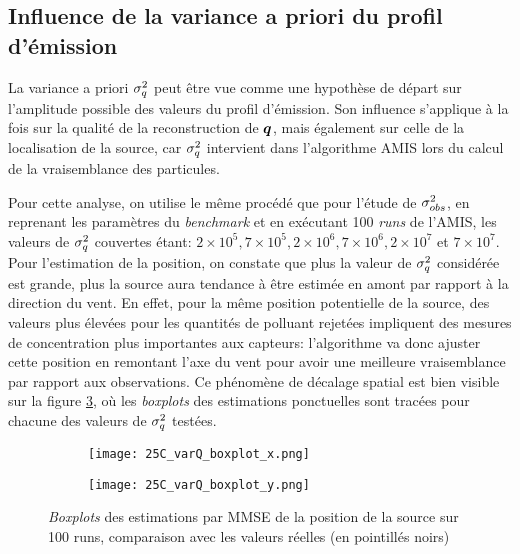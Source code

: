 \subsection{Influence de la variance a priori du profil d'émission}

La variance a priori $\sigma_q^2$ peut être vue comme une hypothèse de départ sur l'amplitude possible des valeurs du profil d'émission. Son influence s'applique à la fois sur la qualité de la reconstruction de ${\bm{q}}$, mais également sur celle de la localisation de la source, car $\sigma_q^2$ intervient dans l'algorithme AMIS lors du calcul de la vraisemblance des particules. 

Pour cette analyse, on utilise le même procédé que pour l'étude de ${\sigma_{obs}^2}$, en reprenant les paramètres du \textit{benchmark} et en exécutant 100 \textit{runs} de l'AMIS, les valeurs de $\sigma_q^2$ couvertes étant: $2\times 10^5, 7\times 10^5, 2\times 10^6, 7\times 10^6, 2\times 10^7$ et $7\times 10^7$.\\

Pour l'estimation de la position, on constate que plus la valeur de $\sigma_q^2$ considérée est grande, plus la source aura tendance à être estimée en amont  par rapport à la direction du vent. En effet, pour la même position potentielle de la source, des valeurs plus élevées pour les quantités de polluant rejetées impliquent des mesures de concentration plus importantes aux capteurs: l'algorithme va donc ajuster cette position en remontant l'axe du vent pour avoir une meilleure vraisemblance par rapport aux observations. Ce phénomène de décalage spatial est bien visible sur la figure \ref{fig_25C_varQ_boxplots}, où les \textit{boxplots} des estimations ponctuelles sont tracées pour chacune des valeurs de $\sigma_q^2$ testées.

\begin{figure}[h!]
	\centering
         	\begin{subfigure}[t]{0.5\textwidth}
         		\centering
         		\texttt{[image: 25C\_varQ\_boxplot\_x.png]}
         		\caption{}
         		\label{varQ_boxplot_x}
         	\end{subfigure}%
         \begin{subfigure}[t]{0.5\textwidth}
         	\centering
         	\texttt{[image: 25C\_varQ\_boxplot\_y.png]}
         	\caption{}
         	\label{varQ_boxplot_y}
         \end{subfigure}%
         \caption{\textit{Boxplots} des estimations par MMSE de la position de la source sur 100 runs, comparaison avec les valeurs réelles (en pointillés noirs)}
         \label{fig_25C_varQ_boxplots}
	
\end{figure}


